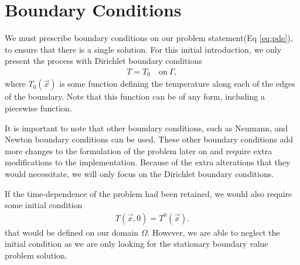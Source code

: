 \documentclass[../fem.tex]{subfiles}
\begin{document}
\section{Boundary Conditions}%
\label{sec:boundary_conditions}

We must prescribe boundary conditions on our problem statement(Eq
\ref{eq:pde}), to ensure that there is a single solution. For this initial
introduction, we only present the process with Dirichlet boundary conditions
\begin{align*}
  T=T_0\quad\text{on}\ \Gamma,
\end{align*}
where $T_0(\vec{x})$ is some function defining the temperature along each of
the edges of the boundary. Note that this function can be of any form,
including a piecewise function.

It is important to note that other boundary conditions, such as Neumann, and
Newton boundary conditions can be used. These other boundary conditions add
more changes to the formulation of the problem later on and require extra
modifications to the implementation. Because of the extra alterations that they
would necessitate, we will only focus on the Dirichlet boundary conditions.

If the time-dependence of the problem had been retained, we would also require
some initial condition
\begin{align*}
  T(\vec{x}, 0) = T^0(\vec{x}).
\end{align*}
that would be defined on our domain $\Omega$. However, we are able to neglect
the initial condition as we are only looking for the stationary boundary value
problem solution.
\end{document}
